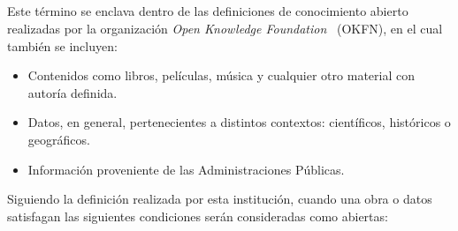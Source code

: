 \subsection{\opendata}\label{opendata-sect}
Este término se enclava dentro de las definiciones de conocimiento abierto realizadas por
la organización \textit{Open Knowledge Foundation}~\cite{okfn} (\gls{OKFN}), en el cual también se incluyen:
\begin{itemize}
 \item Contenidos como libros, películas, música y cualquier otro material con autoría definida.
\item Datos, en general, pertenecientes a distintos contextos: científicos, históricos o geográficos.
\item Información proveniente de las Administraciones Públicas.
\end{itemize}

Siguiendo la definición realizada por esta institución, cuando una obra o datos satisfagan las siguientes
condiciones serán consideradas como abiertas:

